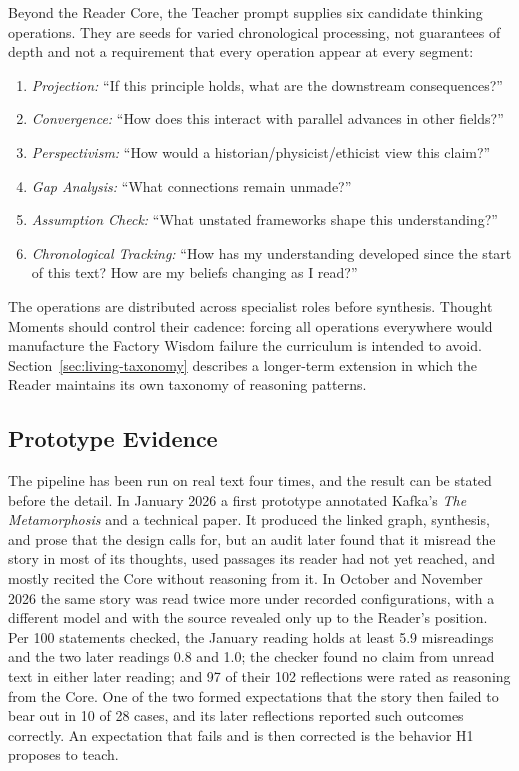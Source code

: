 \documentclass[11pt]{article}
\begin{document}
Beyond the Reader Core, the Teacher prompt supplies six candidate thinking
operations. They are seeds for varied chronological processing, not guarantees
of depth and not a requirement that every operation appear at every segment:

\begin{enumerate}
    \item \emph{Projection:} ``If this principle holds, what are the downstream consequences?''
    \item \emph{Convergence:} ``How does this interact with parallel advances in other fields?''
    \item \emph{Perspectivism:} ``How would a historian/physicist/ethicist view this claim?''
    \item \emph{Gap Analysis:} ``What connections remain unmade?''
    \item \emph{Assumption Check:} ``What unstated frameworks shape this understanding?''
    \item \emph{Chronological Tracking:} ``How has my understanding developed since the start of this text? How are my beliefs changing as I read?''
\end{enumerate}

\noindent The operations are distributed across specialist roles before
synthesis. Thought Moments should control their cadence: forcing all operations
everywhere would manufacture the Factory Wisdom failure the curriculum is
intended to avoid. Section~\ref{sec:living-taxonomy} describes a longer-term
extension in which the Reader maintains its own taxonomy of reasoning patterns.

\subsection{Prototype Evidence}\label{sec:results}\label{sec:generated-trace}

The pipeline has been run on real text four times, and the result can be
stated before the detail. In January 2026 a first prototype annotated Kafka's
\emph{The Metamorphosis} and a technical paper. It produced the linked graph,
synthesis, and prose that the design calls for, but an audit later found that
it misread the story in most of its thoughts, used passages its reader had not
yet reached, and mostly recited the Core without reasoning from it. In October
and November 2026 the same story was read twice more under recorded
configurations, with a different model and with the source revealed only up to
the Reader's position. Per 100 statements checked, the January reading holds at
least 5.9 misreadings and the two later readings 0.8 and 1.0; the checker found
no claim from unread text in either later reading; and 97 of their 102
reflections were rated as reasoning from the Core. One of the two formed
expectations that the story then failed to bear out in 10 of 28 cases, and its
later reflections reported such outcomes correctly. An expectation that fails
and is then corrected is the behavior H1 proposes to teach.
\end{document}
